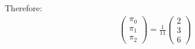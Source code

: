\begin{solution}
\begin{parts}
Therefore:
\begin{align*}
\begin{pmatrix} \pi_0 \\ \pi_1 \\ \pi_2 \end{pmatrix} = 
\frac{1}{11}
\begin{pmatrix} 2 \\ 3 \\ 6 \end{pmatrix}
\end{align*}


\end{parts}
\end{solution}
